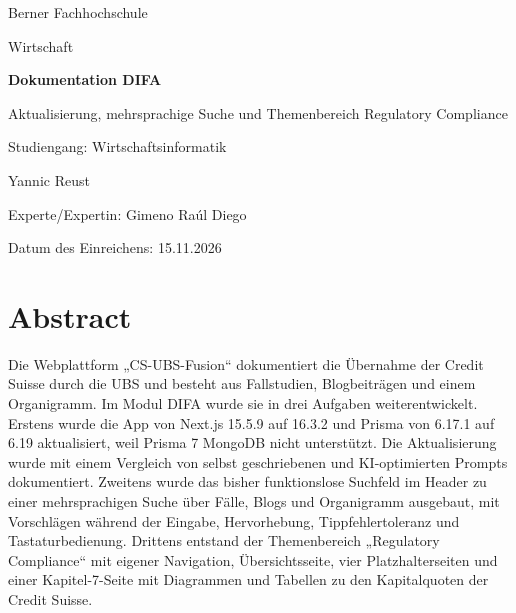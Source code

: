 \documentclass[11pt,a4paper]{article}
\begin{document}
\begin{titlepage}
  \centering
  \vspace*{2cm}
  {\large Berner Fachhochschule\par}
  \vspace{0.3cm}
  {\large Wirtschaft\par}
  \vspace{3cm}
  {\Huge\bfseries Dokumentation DIFA\par}
  \vspace{0.8cm}
  {\Large Aktualisierung, mehrsprachige Suche und Themenbereich Regulatory Compliance\par}
  \vspace{3cm}
  {\large Studiengang: Wirtschaftsinformatik\par}
  \vspace{1cm}
  {\large Yannic Reust\par}
  \vspace{0.5cm}
  {\large Experte/Expertin: Gimeno Raúl Diego\par}
  \vspace{0.5cm}
  {\large Datum des Einreichens: 15.11.2026\par}
\end{titlepage}

\section*{Abstract}
Die Webplattform „CS-UBS-Fusion“ dokumentiert die Übernahme der Credit Suisse durch die UBS und besteht aus Fallstudien, Blogbeiträgen und einem Organigramm. Im Modul DIFA wurde sie in drei Aufgaben weiterentwickelt. Erstens wurde die App von Next.js 15.5.9 auf 16.3.2 und Prisma von 6.17.1 auf 6.19 aktualisiert, weil Prisma 7 MongoDB nicht unterstützt. Die Aktualisierung wurde mit einem Vergleich von selbst geschriebenen und KI-optimierten Prompts dokumentiert. Zweitens wurde das bisher funktionslose Suchfeld im Header zu einer mehrsprachigen Suche über Fälle, Blogs und Organigramm ausgebaut, mit Vorschlägen während der Eingabe, Hervorhebung, Tippfehlertoleranz und Tastaturbedienung. Drittens entstand der Themenbereich „Regulatory Compliance“ mit eigener Navigation, Übersichtsseite, vier Platzhalterseiten und einer Kapitel-7-Seite mit Diagrammen und Tabellen zu den Kapitalquoten der Credit Suisse.
\end{document}

